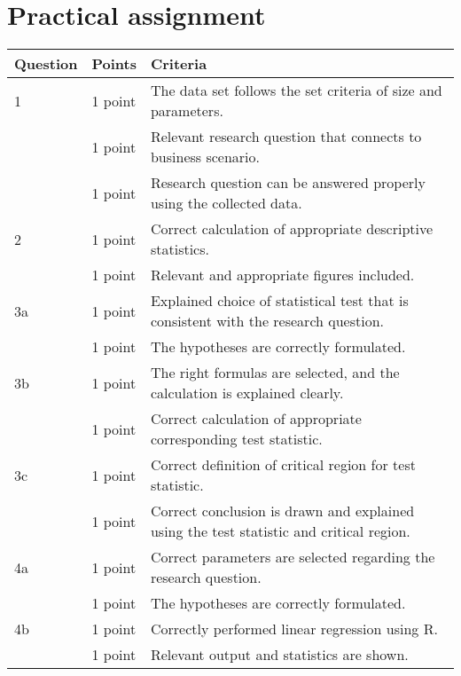 
\section{Practical assignment}

\selectfont 

\begin{center}
\small
\begin{tabularx}{\textwidth}{l|l|>{\raggedright\arraybackslash}X}
    \textbf{Question} & \textbf{Points} & \textbf{Criteria} \\
    \hline
     1 & 1 point & The data set follows the set criteria of size and parameters.  \\
     & 1 point & Relevant research question that connects to business scenario. \\
     & 1 point & Research question can be answered properly using the collected data. \\
     2 & 1 point & Correct calculation of appropriate descriptive statistics. \\
     & 1 point & Relevant and appropriate figures included. \\
     3a & 1 point & Explained choice of statistical test that is consistent with the research question. \\
     & 1 point & The hypotheses are correctly formulated. \\
     3b & 1 point & The right formulas are selected, and the calculation is explained clearly. \\
     & 1 point & Correct calculation of appropriate corresponding test statistic. \\
     3c & 1 point & Correct definition of critical region for test statistic. \\
     & 1 point & Correct conclusion is drawn and explained using the test statistic and critical region. \\
     4a & 1 point & Correct parameters are selected regarding the research question. \\
     & 1 point & The hypotheses are correctly formulated. \\
     4b & 1 point & Correctly performed linear regression using R. \\
     & 1 point & Relevant output and statistics are shown. \\

\end{tabularx}
\end{center}
